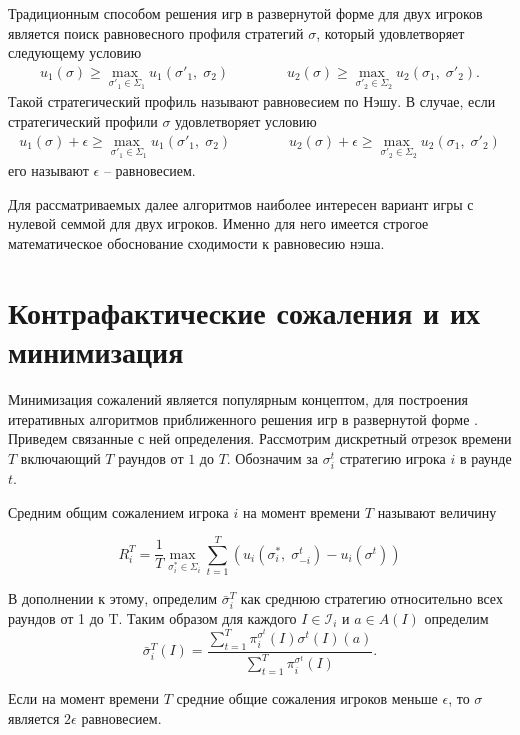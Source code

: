 Традиционным способом решения игр в развернутой форме для двух игроков является поиск равновесного профиля стратегий $\sigma$, который удовлетворяет следующему условию 
\begin{equation}
\begin{split}
	u_1(\sigma)\geq \underset{\sigma'_1\in \Sigma_1}{\max\;} u_1(\sigma'_1,\;\sigma_2) & \;\;\;\;\;\;\;\;\;\;\;\; u_2(\sigma)\geq \underset{\sigma'_2\in \Sigma_2}{\max\;} u_2(\sigma_1,\;\sigma'_2).
\end{split}
\end{equation} 
Такой стратегический профиль называют равновесием по Нэшу. В случае, если стратегический профили $\sigma$ удовлетворяет условию 
\begin{equation}
	\begin{split}
		u_1(\sigma)+\epsilon\geq \underset{\sigma'_1\in \Sigma_1}{\max\;} u_1(\sigma'_1,\;\sigma_2) & \;\;\;\;\;\;\;\;\;\;\;\; u_2(\sigma)+\epsilon\geq \underset{\sigma'_2\in \Sigma_2}{\max\;} u_2(\sigma_1,\;\sigma'_2)
	\end{split}
\end{equation}
его называют $\epsilon$ – равновесием.
\par
Для рассматриваемых далее алгоритмов наиболее интересен вариант игры с нулевой семмой для двух игроков. Именно для него имеется строгое математическое обоснование сходимости к равновесию нэша.

\section{Контрафактические сожаления и их минимизация}

Минимизация сожалений является популярным концептом, для построения итеративных алгоритмов приближенного решения игр в развернутой форме \cite{RegretMatching}. Приведем связанные с ней определения. Рассмотрим дискретный отрезок времени $T$ включающий $T$ раундов от $1$ до $T$. Обозначим за $\sigma_i^t$ стратегию игрока $i$ в раунде $t$. 
\begin{defin}
	Средним общим сожалением игрока $i$ на момент времени $T$ называют величину 
\end{defin}
\begin{equation}
	R_i^T=\frac{1}{T} \underset{\sigma_i^*\in \Sigma_i}{\max\;}\sum_{t=1}^{T}(u_i(\sigma_i^* ,\;\sigma_{-i}^t)-u_i(\sigma^t))
\end{equation} 

В дополнении к этому, определим $\bar{\sigma}_i^T$ как среднюю стратегию относительно всех раундов от 1 до T. Таким образом для каждого $I \in \mathcal{I}_i$ и $a\in A(I)$ определим 
\begin{equation}
	\bar{\sigma}_i^T(I)=\frac{\sum^T_{t=1}\pi_i^{\sigma^t}(I)\sigma^t(I)(a)}{\sum_{t=1}^{T}\pi_i^{\sigma^t}(I)}.
\end{equation}
\begin{theo} Если на момент времени $T$ средние общие сожаления игроков меньше $\epsilon$, то $\sigma$ является $2\epsilon$ равновесием. 
\end{theo}

